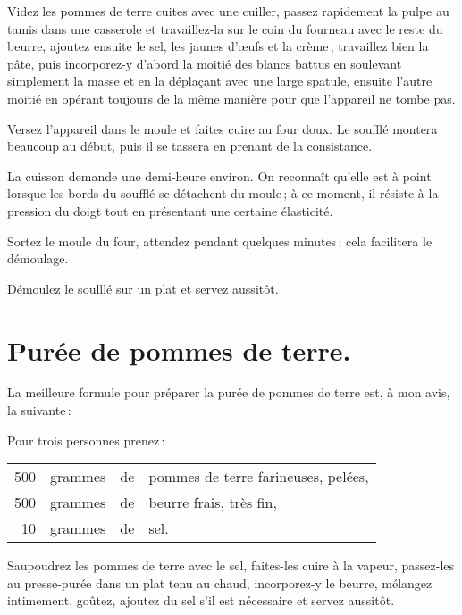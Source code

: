 Videz les pommes de terre cuites avec une cuiller, passez rapidement la pulpe
au tamis dans une casserole et travaillez-la sur le coin du fourneau avec le
reste du beurre, ajoutez ensuite le sel, les jaunes d'œufs et la crème ;
travaillez bien la pâte, puis incorporez-y d'abord la moitié des blancs battus
en soulevant simplement la masse et en la déplaçant avec une large spatule,
ensuite l'autre moitié en opérant toujours de la même manière pour que
l'appareil ne tombe pas.

Versez l'appareil dans le moule et faites cuire au four doux. Le soufflé
montera beaucoup au début, puis il se tassera en prenant de la consistance.

La cuisson demande une demi-heure environ. On reconnaît qu'elle est à point
lorsque les bords du soufflé se détachent du moule ; à ce moment, il résiste
à la pression du doigt tout en présentant une certaine élasticité.

Sortez le moule du four, attendez pendant quelques minutes : cela facilitera le
démoulage.

Démoulez le soulllé sur un plat et servez aussitôt.

\section*{\centering Purée de pommes de terre.}
{}

La meilleure formule pour préparer la purée de pommes de terre est, à mon avis,
la suivante :

\medskip

Pour trois personnes prenez :

\footnotesize
\begin{longtable}{rrrp{16em}}
    500 & grammes & de & pommes de terre farineuses, pelées,                                              \\
    500 & grammes & de & beurre frais, très fin,                                                          \\
     10 & grammes & de & sel.                                                                             \\
\end{longtable}
\normalsize

Saupoudrez les pommes de terre avec le sel, faites-les cuire à la vapeur,
passez-les au presse-purée dans un plat tenu au chaud, incorporez-y le beurre,
mélangez intimement, goûtez, ajoutez du sel s'il est nécessaire et servez
aussitôt.

